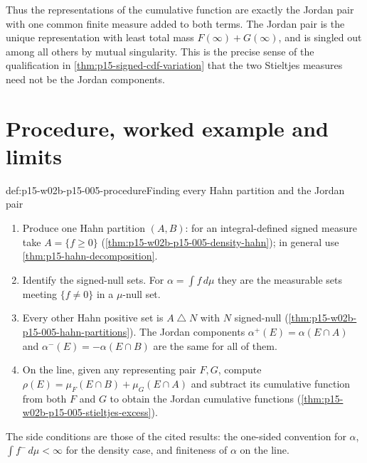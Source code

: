 Thus the representations of the cumulative function are exactly the
Jordan pair with one common finite measure added to both terms. The
Jordan pair is the unique representation with least total mass
\(F(\infty)+G(\infty)\), and is singled out among all others by mutual
singularity. This is the precise sense of the qualification in
\cref{thm:p15-signed-cdf-variation} that the two Stieltjes measures
need not be the Jordan components.

\section{Procedure, worked example and limits}
\label{sec:p15-w02b-p15-005-procedure}

\begin{hbmethod}{def:p15-w02b-p15-005-procedure}{Finding every Hahn partition and the Jordan pair}
\begin{enumerate}
\item Produce one Hahn partition \((A,B)\): for an integral-defined
      signed measure take \(A=\{f\geq0\}\)
      (\cref{thm:p15-w02b-p15-005-density-hahn}); in general use
      \cref{thm:p15-hahn-decomposition}.
\item Identify the signed-null sets. For \(\alpha=\int f\,d\mu\) they are
      the measurable sets meeting \(\{f\neq0\}\) in a \(\mu\)-null set.
\item Every other Hahn positive set is \(A\mathbin{\triangle}N\) with
      \(N\) signed-null (\cref{thm:p15-w02b-p15-005-hahn-partitions}).
      The Jordan components \(\alpha^+(E)=\alpha(E\cap A)\) and
      \(\alpha^-(E)=-\alpha(E\cap B)\) are the same for all of them.
\item On the line, given any representing pair \(F,G\), compute
      \(\rho(E)=\mu_F(E\cap B)+\mu_G(E\cap A)\) and subtract its
      cumulative function from both \(F\) and \(G\) to obtain the
      Jordan cumulative functions
      (\cref{thm:p15-w02b-p15-005-stieltjes-excess}).
\end{enumerate}
The side conditions are those of the cited results: the one-sided
convention for \(\alpha\), \(\int f^-\,d\mu<\infty\) for the density
case, and finiteness of \(\alpha\) on the line.
\end{hbmethod}

